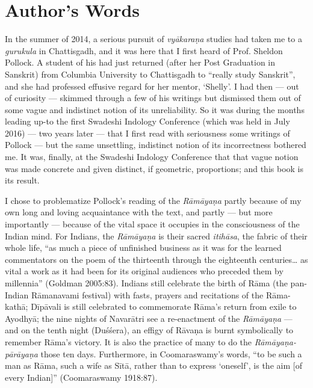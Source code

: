 \chapter*{Author's Words}\label{authors-words}



In the summer of 2014, a serious pursuit of {\sl vyākaraṇa} studies had taken me to a {\sl gurukula} in Chattisgadh, and it was here that I first heard of Prof. Sheldon Pollock. A student of his had just returned (after her Post Graduation in Sanskrit) from Columbia University to Chattisgadh to “really study Sanskrit”, and she had professed effusive regard for her mentor, ‘Shelly’. I had then --- out of curiosity --- skimmed through a few of his writings but dismissed them out of some vague and indistinct notion of its unreliability. So it was during the months leading up-to the first Swadeshi Indology Conference (which was held in July 2016) --- two years later --- that I first read with seriousness some writings of Pollock --- but the same unsettling, indistinct notion of its incorrectness bothered me. It was, finally, at the Swadeshi Indology Conference that that vague notion was made concrete and given distinct, if geometric, proportions; and this book is its result.  

I chose to problematize Pollock’s reading of the {\sl Rāmāyaṇa} partly because of my own long and loving acquaintance with the text, and partly --- but more importantly --- because of the vital space it occupies in the consciousness of the Indian mind. For Indians, the {\sl Rāmāyaṇa} is their sacred {\sl itihāsa}, the fabric of their whole life, “as much a piece of unfinished business as it was for the learned commentators on the poem of the thirteenth through the eighteenth centuries… as vital a work as it had been for its original audiences who preceded them by millennia” (Goldman 2005:83). Indians still celebrate the birth of Rāma (the pan-Indian Rāmanavami festival) with fasts, prayers and recitations of the Rāma-kathā; Dīpāvali is still celebrated to commemorate Rāma’s return from exile to Ayodhyā; the nine nights of Navarātri see a re-enactment of the {\sl Rāmāyaṇa} --- and on the tenth night (Duśśera), an effigy of Rāvaṇa is burnt symbolically to remember Rāma’s victory. It is also the practice of many to do the {\sl Rāmāyaṇa-pārāyaṇa} those ten days. Furthermore, in Coomaraswamy’s words, “to be such a man as Rāma, such a wife as Sītā, rather than to express ‘oneself’, is the aim [of every Indian]” (Coomaraswamy 1918:87).

